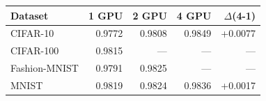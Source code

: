 \begin{tabular}{lrrrr}
\toprule
Dataset & 1 GPU & 2 GPU & 4 GPU & $\Delta$(4-1) \\
\midrule
CIFAR-10 & 0.9772 & 0.9808 & 0.9849 & +0.0077 \\
CIFAR-100 & 0.9815 & — & — & — \\
Fashion-MNIST & 0.9791 & 0.9825 & — & — \\
MNIST & 0.9819 & 0.9824 & 0.9836 & +0.0017 \\
\bottomrule
\end{tabular}